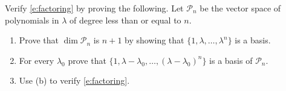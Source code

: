 \documentclass{ximera}
\begin{document}
\begin{computerExercise} \label{c8.2.a1}
Verify \eqref{e:factoring} by proving the following.  Let $\mathcal{P}_n$ be the vector space 
of polynomials in $\lambda$ of degree less than or equal to $n$.
\begin{enumerate}
\item Prove that $\dim\mathcal{P}_n$ is $n+1$ by showing that $\{1,\lambda,\ldots,\lambda^n\}$ 
is a basis.
\item For every $\lambda_0$ prove that $\{1, \lambda-\lambda_0, \ldots,(\lambda-\lambda_0)^n\}$ 
is a basis of $\mathcal{P}_n$.
\item Use {\rm (b)} to verify \eqref{e:factoring}.
\end{enumerate}
\end{computerExercise}
\end{document}
